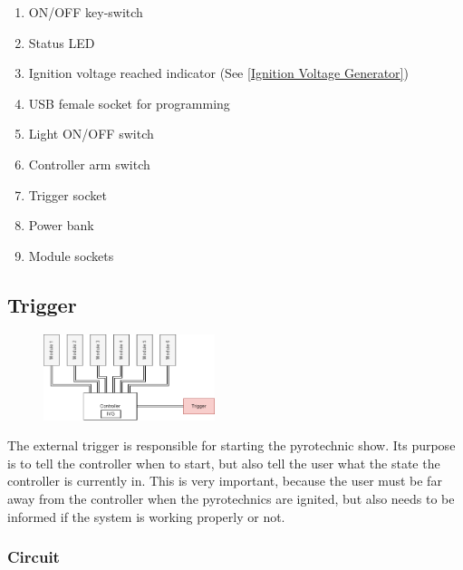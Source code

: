 \begin{enumerate}
	\item ON/OFF key-switch
	\item Status LED 
	\item Ignition voltage reached indicator (See \cref{Ignition Voltage Generator})
	\item USB female socket for programming
	\item Light ON/OFF switch
	\item Controller arm switch
	\item Trigger socket
	\item Power bank
	\item Module sockets
\end{enumerate}

\pagebreak

\subsection{Trigger}

\begin{figure}[!ht]
    \centering
    \includegraphics[width=5cm]{./Figures/concept_trigger.png} 
\end{figure}

\noindent The external trigger is responsible for starting the pyrotechnic show. Its purpose is to tell the controller when to start, but also tell the user what the state the controller is currently in. This is very important, because the user must be far away from the controller when the pyrotechnics are ignited, but also needs to be informed if the system is working properly or not.

\subsubsection{Circuit}

